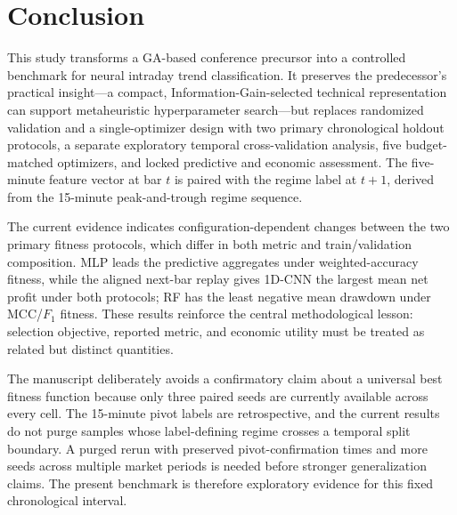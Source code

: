 \section{Conclusion}\label{sec:conclusion}

This study transforms a GA-based conference precursor into a controlled benchmark for neural intraday trend classification. It preserves the predecessor's practical insight---a compact, Information-Gain-selected technical representation can support metaheuristic hyperparameter search---but replaces randomized validation and a single-optimizer design with two primary chronological holdout protocols, a separate exploratory temporal cross-validation analysis, five budget-matched optimizers, and locked predictive and economic assessment. The five-minute feature vector at bar $t$ is paired with the regime label at $t+1$, derived from the 15-minute peak-and-trough regime sequence.

The current evidence indicates configuration-dependent changes between the two primary fitness protocols, which differ in both metric and train/validation composition. MLP leads the predictive aggregates under weighted-accuracy fitness, while the aligned next-bar replay gives 1D-CNN the largest mean net profit under both protocols; RF has the least negative mean drawdown under MCC/$F_1$ fitness. These results reinforce the central methodological lesson: selection objective, reported metric, and economic utility must be treated as related but distinct quantities.

The manuscript deliberately avoids a confirmatory claim about a universal best fitness function because only three paired seeds are currently available across every cell. The 15-minute pivot labels are retrospective, and the current results do not purge samples whose label-defining regime crosses a temporal split boundary. A purged rerun with preserved pivot-confirmation times and more seeds across multiple market periods is needed before stronger generalization claims. The present benchmark is therefore exploratory evidence for this fixed chronological interval.

